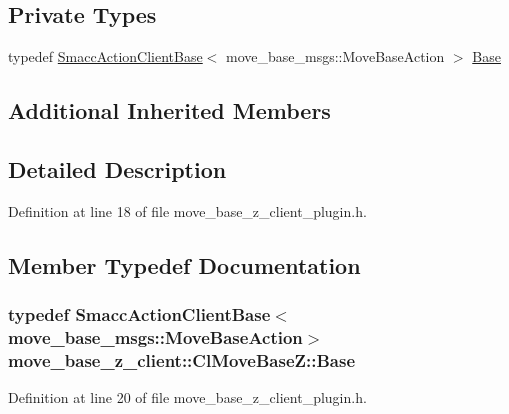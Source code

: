 \subsection*{Private Types}
\begin{DoxyCompactItemize}
\item 
typedef \hyperlink{classsmacc_1_1client__bases_1_1SmaccActionClientBase_a942113f29871c3e2c3fff9e951500805}{Smacc\+Action\+Client\+Base}$<$ move\+\_\+base\+\_\+msgs\+::\+Move\+Base\+Action $>$ \hyperlink{classmove__base__z__client_1_1ClMoveBaseZ_a5446f4fb56caf7c8de8dd3bd34ae64d6}{Base}
\end{DoxyCompactItemize}
\subsection*{Additional Inherited Members}


\subsection{Detailed Description}


Definition at line 18 of file move\+\_\+base\+\_\+z\+\_\+client\+\_\+plugin.\+h.



\subsection{Member Typedef Documentation}
\subsubsection[{\texorpdfstring{Base}{Base}}]{\setlength{\rightskip}{0pt plus 5cm}typedef {\bf Smacc\+Action\+Client\+Base}$<$move\+\_\+base\+\_\+msgs\+::\+Move\+Base\+Action$>$ {\bf move\+\_\+base\+\_\+z\+\_\+client\+::\+Cl\+Move\+Base\+Z\+::\+Base}\hspace{0.3cm}{\ttfamily [private]}}\hypertarget{classmove__base__z__client_1_1ClMoveBaseZ_a5446f4fb56caf7c8de8dd3bd34ae64d6}{}\label{classmove__base__z__client_1_1ClMoveBaseZ_a5446f4fb56caf7c8de8dd3bd34ae64d6}


Definition at line 20 of file move\+\_\+base\+\_\+z\+\_\+client\+\_\+plugin.\+h.

